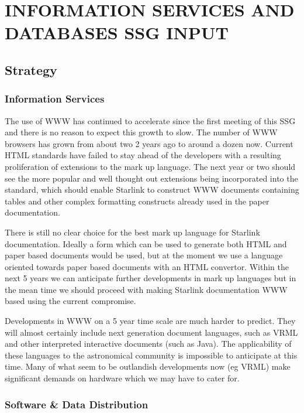 \newpage
\section{INFORMATION SERVICES AND DATABASES SSG INPUT}

\subsection{Strategy}

\subsubsection{Information Services}

The use of WWW has continued to accelerate since the first meeting of
this SSG and there is no reason to expect this growth to slow. The
number of WWW browsers has grown from about two 2 years ago to around
a dozen now. Current HTML standards have failed to stay ahead of the
developers with a resulting proliferation of extensions to the mark up
language.  The next year or two should see the more popular and well
thought out extensions being incorporated into the standard, which
should enable Starlink to construct WWW documents containing tables
and other complex formatting constructs already used in the paper
documentation.

There is still no clear choice for the best mark up language for Starlink 
documentation. Ideally a form which can be used to generate both HTML
and paper based documents would be used, but at the moment we use a
language oriented towards paper based documents with an HTML convertor.
Within the next 5 years we can anticipate further developments in mark
up languages but in the mean time we should proceed with making Starlink
documentation WWW based using the current compromise.

Developments in WWW on a 5 year time scale are much harder to predict.
They will almost certainly include next generation document languages,
such as VRML and other interpreted interactive documents (such as Java). 
The applicability of these languages to the astronomical community is
impossible to anticipate at this time. Many of what seem to be outlandish
developments now (eg VRML) make significant demands on hardware which
we may have to cater for.

\subsubsection{Software \& Data Distribution}

